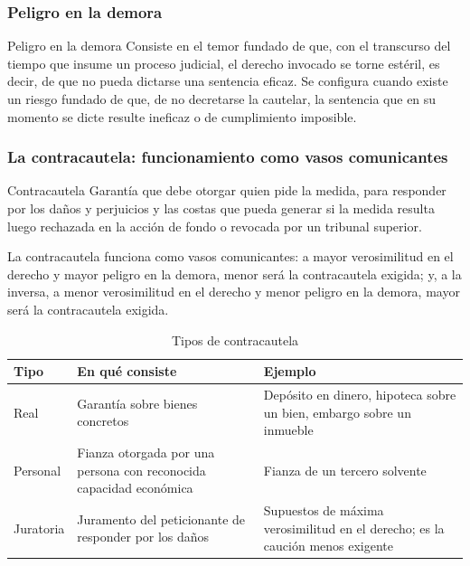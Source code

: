 \documentclass[12pt,oneside]{book}
\begin{document}
\subsubsection{Peligro en la demora}

\begin{definition}{Peligro en la demora}
Consiste en el temor fundado de que, con el transcurso del tiempo que insume un proceso judicial, el derecho invocado se torne estéril, es decir, de que no pueda dictarse una sentencia eficaz. Se configura cuando existe un riesgo fundado de que, de no decretarse la cautelar, la sentencia que en su momento se dicte resulte ineficaz o de cumplimiento imposible.
\end{definition}

\subsubsection{La contracautela: funcionamiento como vasos comunicantes}

\begin{definition}{Contracautela}
Garantía que debe otorgar quien pide la medida, para responder por los daños y perjuicios y las costas que pueda generar si la medida resulta luego rechazada en la acción de fondo o revocada por un tribunal superior.
\end{definition}

\begin{important}
La contracautela funciona como vasos comunicantes: a mayor verosimilitud en el derecho y mayor peligro en la demora, menor será la contracautela exigida; y, a la inversa, a menor verosimilitud en el derecho y menor peligro en la demora, mayor será la contracautela exigida.
\end{important}

\begin{table}[H]
\centering
\begin{tabularx}{\textwidth}{
    >{\raggedright\arraybackslash}p{}
    >{\raggedright\arraybackslash}p{}
    >{\raggedright\arraybackslash}X
}
\toprule
\textbf{Tipo} & \textbf{En qué consiste} & \textbf{Ejemplo} \\
\midrule
Real & Garantía sobre bienes concretos & Depósito en dinero, hipoteca sobre un bien, embargo sobre un inmueble \\
Personal & Fianza otorgada por una persona con reconocida capacidad económica & Fianza de un tercero solvente \\
Juratoria & Juramento del peticionante de responder por los daños & Supuestos de máxima verosimilitud en el derecho; es la caución menos exigente \\
\bottomrule
\end{tabularx}
\caption{Tipos de contracautela}
\end{table}
\end{document}
